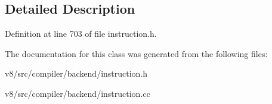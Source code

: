 \subsection{Detailed Description}


Definition at line 703 of file instruction.\+h.



The documentation for this class was generated from the following files\+:\begin{DoxyCompactItemize}
\item 
v8/src/compiler/backend/instruction.\+h\item 
v8/src/compiler/backend/instruction.\+cc\end{DoxyCompactItemize}
